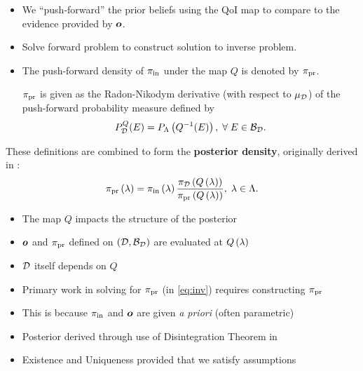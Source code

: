 \begin{frame}[t]
\begin{itemize}
	\item <1->We ``push-forward'' the prior beliefs using the QoI map to compare to the evidence provided by $\operatorname*{\boldsymbol{o}}$. 
	\item <2-> Solve forward problem to construct solution to inverse problem. 
	\item <3-> The push-forward density of $\operatorname*{\pi_{in}}$ under the map $Q$ is denoted by $\operatorname*{\pi_{pr}}$. 
	\begin{defn}\label{defn:pfprior}
$\operatorname*{\pi_{pr}}$ is given as the Radon-Nikodym derivative (with respect to $\mu_{\mathcal{D}}$) of the push-forward probability measure defined by 
\begin{equation}\label{eq:pfpr}
P_{\mathcal{D}}^Q (E)  = P_{\Lambda} \left ( Q^{-1}(E) \right ), \; \forall \; E \in \mathcal{B}_{\mathcal{D}}.
\end{equation}
\end{defn}

\end{itemize}

\end{frame}

\begin{frame}[t]
These definitions are combined to form the \textbf{posterior density}, originally derived in \cite{BJW18}:
\begin{equation}\label{eq:post}
\operatorname*{\pi_{pr}} \left ( \lambda \right ) = \operatorname*{\pi_{in}} \left ( \lambda \right ) \frac{\pi_{\mathcal{D}} \left ( Q\left ( \lambda \right ) \right ) }{\operatorname*{\pi_{pr}} \left ( Q\left ( \lambda \right ) \right ) }, \; \lambda \in {\Lambda}.
\end{equation}

\begin{itemize}
	\item <1-> The map $Q$ impacts the structure of the posterior
	\item <2-> $\operatorname*{\boldsymbol{o}}$ and $\operatorname*{\pi_{pr}}$ defined on $(\mathcal{D}, \mathcal{B}_{\mathcal{D}})$ are evaluated at $Q\left ( \lambda \right )$
	\item <2-> $\mathcal{D}$ itself depends on $Q$
	\item <3-> Primary work in solving for $\operatorname*{\pi_{pr}}$ (in \eqref{eq:inv}) requires constructing $\operatorname*{\pi_{pr}}$
	\item <4-> This is because $\operatorname*{\pi_{in}}$ and $\operatorname*{\boldsymbol{o}}$ are given \emph{a priori} (often parametric)
	\item <5-> Posterior derived through use of Disintegration Theorem in \cite{BJW18}
	\item <6-> Existence and Uniqueness provided that we satisfy assumptions
\end{itemize}
\end{frame}



